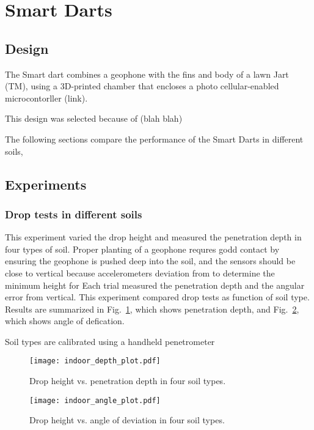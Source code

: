 \section{Smart Darts}\label{sec:SmartDarts}

\subsection{Design}
The Smart dart combines a geophone  with the fins and body of a lawn Jart (TM), using a 3D-printed chamber that encloses a photo cellular-enabled microcontorller (link).

This design was selected because of (blah blah)

The following sections compare the performance of the Smart Darts in different soils, 



\subsection{Experiments}
\subsubsection{ Drop tests in different soils} 
This experiment varied the drop height and measured the penetration depth in four types of soil.
Proper planting of a geophone requres godd contact by ensuring the geophone is pushed deep into the soil, and the sensors should be close to vertical because accelerometers
deviation from 
 to determine the minimum height for
Each trial measured the penetration depth and the angular error from vertical.
This experiment compared drop tests as function of soil type.  
Results are summarized in Fig.~\ref{fig:DepthPlotIndoors}, which shows penetration depth, and Fig.~\ref{fig:AnglePlotIndoors}, which shows angle of defication.

Soil types are calibrated using a handheld penetrometer 

\begin{figure} \centering
{\texttt{[image: indoor\_depth\_plot.pdf]}}
\caption{Drop height vs. penetration depth in four soil types.} 
\label{fig:DepthPlotIndoors}
\end{figure}

\begin{figure} \centering
{\texttt{[image: indoor\_angle\_plot.pdf]}}
\caption{Drop height vs. angle of deviation in four soil types.} 
\label{fig:AnglePlotIndoors}
\vspace{-1em}
\end{figure}

